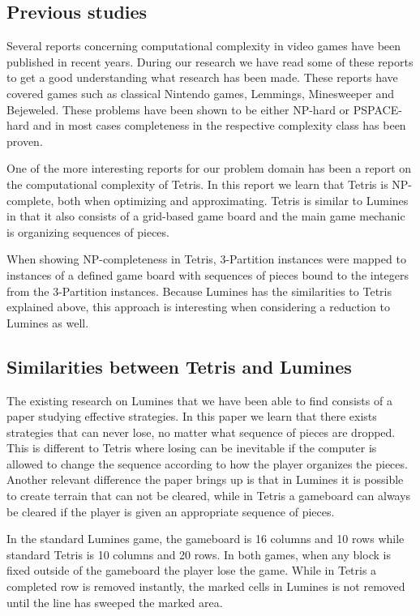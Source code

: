 \subsection{Previous studies}

Several reports concerning computational complexity in video games have been published in recent years. During our research we have read some of these reports to get a good understanding what research has been made. These reports have covered games such as classical Nintendo games\cite{classic}, Lemmings\cite{lemmings}, Minesweeper\cite{minesweeper} and Bejeweled\cite{candy}. These problems have been shown to be either NP-hard or PSPACE-hard and in most cases completeness in the respective complexity class has been proven.

One of the more interesting reports for our problem domain has been a report on the computational complexity of Tetris\cite{tetris}. In this report we learn that Tetris is NP-complete,  both when optimizing and approximating. Tetris is similar to Lumines in that it also consists of a grid-based game board and the main game mechanic is organizing sequences of pieces.

When showing NP-completeness in Tetris, 3-Partition instances were mapped to instances of a defined game board with sequences of pieces bound to the integers from the 3-Partition instances. Because Lumines has the similarities to Tetris explained above, this approach is interesting when considering a reduction to Lumines as well.


\subsection{Similarities between Tetris and Lumines}

The existing research on Lumines that we have been able to find consists of a paper studying effective strategies. In this paper we learn that there exists strategies that can never lose, no matter what sequence of pieces are dropped. This is different to Tetris where losing can be inevitable if the computer is allowed to change the sequence according to how the player organizes the pieces. Another relevant difference the paper brings up is that in Lumines it is possible to create terrain that can not be cleared, while in Tetris a gameboard can always be cleared if the player is given an appropriate sequence of pieces.

In the standard Lumines game, the gameboard is 16 columns and 10 rows while standard Tetris is 10 columns and 20 rows. In both games, when any block is fixed outside of the gameboard the player lose the game. While in Tetris a completed row is removed instantly, the marked cells in Lumines is not removed until the line has sweeped the marked area.


